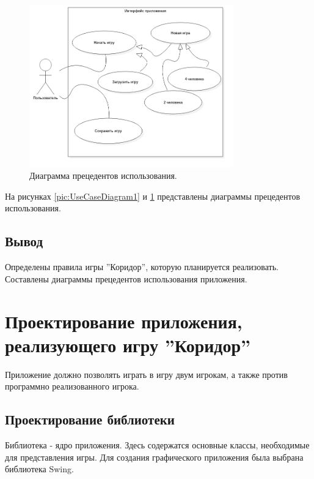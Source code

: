 \documentclass[a4paper]{article}
\begin{document}
\begin{figure}[H]
	\begin{center}
		\includegraphics[scale=0.5, height=7cm]{../pictures/UseCaseDiagram2.png}
		\caption{Диаграмма прецедентов использования.} 
		\label{pic:UseCaseDiagram2} %
	\end{center}
\end{figure}
На рисунках \ref{pic:UseCaseDiagram1} и \ref{pic:UseCaseDiagram2} представлены диаграммы прецедентов использования.

\subsection{Вывод}
Определены правила игры ''Коридор'', которую планируется реализовать. Составлены диаграммы прецедентов использования приложения.

\section{Проектирование приложения, реализующего игру ''Коридор''}
Приложение должно позволять играть в игру двум игрокам, а также против программно реализованного игрока.

\subsection{Проектирование библиотеки}
Библиотека  - ядро приложения. Здесь содержатся основные классы, необходимые для представления игры. Для создания графического приложения была выбрана библиотека Swing.
\end{document}
